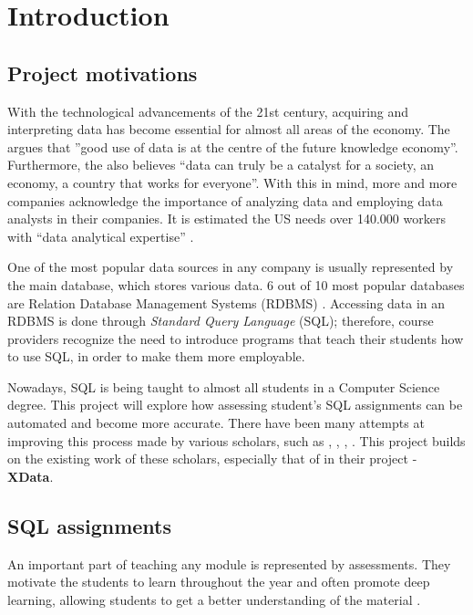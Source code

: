 \chapter{Introduction} \label{ch:introduction}
\section{Project motivations}
With the technological advancements of the 21st century, acquiring and interpreting
data has become essential for almost all areas of the economy. The \cite{ec:big_data} argues that ''good use of data is at
the centre of the future knowledge economy''.
Furthermore, the \cite{gov:big_data} also believes ``data can truly be a catalyst for a society, an economy, a country that works for everyone''. With this in mind, more and more companies acknowledge the importance of analyzing data and employing data analysts in their companies. It is estimated the US needs over 140.000 workers with ``data analytical expertise'' \citep{Lohr2012}.

One of the most popular data sources in any company is usually represented by the main database, which stores various data. 6 out of 10 most popular databases are Relation Database Management Systems (RDBMS) \citep{db_engine:statistics}.
Accessing data in an RDBMS is done through \textit{Standard Query Language}
(SQL); therefore, course providers recognize the need to introduce programs that teach their students how to use SQL, in order to make them more employable.

Nowadays, SQL is being taught to almost all students in a Computer Science
degree. This project will explore how assessing student's SQL
assignments can be automated and become more accurate. There have been many attempts at improving this process made by various scholars, such as \cite{literature:activesql}, \cite{literature:assesql},
\cite{literature:sqlify}, \cite{literature:xdata}. This project builds on the existing work of these scholars, especially that of \cite{literature:xdata} in their project - \textbf{XData}.

\section{SQL assignments} \label{ch:introduction:assignments}

An important part of teaching any module is represented by assessments. They motivate the students to learn throughout the year and often promote deep learning, allowing students to get a better understanding of the material \citep{literature:assement}.


